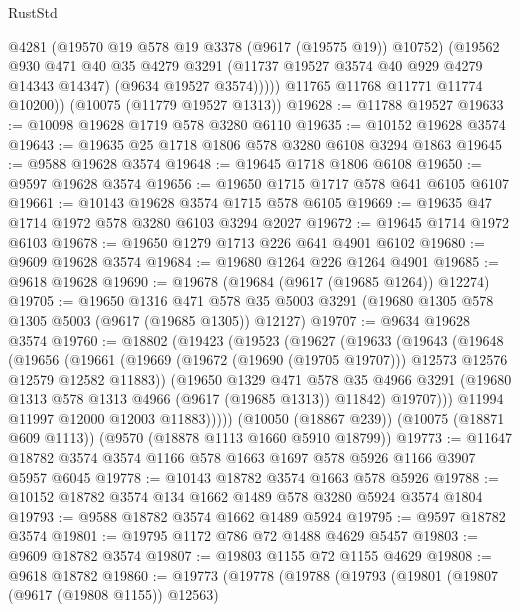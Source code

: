 \begin{lexlean}{RustStd}
\begin{coremodule}
{\begin{coremodule}
{{{{{{{{{{{{{{{{{{{{{{{{{{{{{{{{{              @4281
              (@19570 @19 @578 @19 @3378 (@9617 (@19575 @19)) @10752)
              (@19562
                @930
                @471
                @40
                @35
                @4279
                @3291
                (@11737 @19527 @3574 @40 @929 @4279 @14343 @14347)
                (@9634 @19527 @3574)))))
        @11765
        @11768
        @11771
        @11774
        @10200))
    (@10075 (@11779 @19527 @1313))
@19628 := @11788 @19527
@19633 := @10098 @19628 @1719 @578 @3280 @6110
@19635 := @10152 @19628 @3574
@19643 := @19635 @25 @1718 @1806 @578 @3280 @6108 @3294 @1863
@19645 := @9588 @19628 @3574
@19648 := @19645 @1718 @1806 @6108
@19650 := @9597 @19628 @3574
@19656 := @19650 @1715 @1717 @578 @641 @6105 @6107
@19661 := @10143 @19628 @3574 @1715 @578 @6105
@19669 := @19635 @47 @1714 @1972 @578 @3280 @6103 @3294 @2027
@19672 := @19645 @1714 @1972 @6103
@19678 := @19650 @1279 @1713 @226 @641 @4901 @6102
@19680 := @9609 @19628 @3574
@19684 := @19680 @1264 @226 @1264 @4901
@19685 := @9618 @19628
@19690 := @19678 (@19684 (@9617 (@19685 @1264)) @12274)
@19705 := @19650
    @1316
    @471
    @578
    @35
    @5003
    @3291
    (@19680 @1305 @578 @1305 @5003 (@9617 (@19685 @1305)) @12127)
@19707 := @9634 @19628 @3574
@19760 := @18802
    (@19423
      (@19523
        (@19627
          (@19633
            (@19643
              (@19648
                (@19656
                  (@19661
                    (@19669 (@19672 (@19690 (@19705 @19707))) @12573 @12576 @12579 @12582 @11883))
                  (@19650
                    @1329
                    @471
                    @578
                    @35
                    @4966
                    @3291
                    (@19680 @1313 @578 @1313 @4966 (@9617 (@19685 @1313)) @11842)
                    @19707)))
              @11994
              @11997
              @12000
              @12003
              @11883)))))
    (@10050 (@18867 @239))
    (@10075 (@18871 @609 @1113))
    (@9570 (@18878 @1113 @1660 @5910 @18799))
@19773 := @11647 @18782 @3574 @3574 @1166 @578 @1663 @1697 @578 @5926 @1166 @3907 @5957 @6045
@19778 := @10143 @18782 @3574 @1663 @578 @5926
@19788 := @10152 @18782 @3574 @134 @1662 @1489 @578 @3280 @5924 @3574 @1804
@19793 := @9588 @18782 @3574 @1662 @1489 @5924
@19795 := @9597 @18782 @3574
@19801 := @19795 @1172 @786 @72 @1488 @4629 @5457
@19803 := @9609 @18782 @3574
@19807 := @19803 @1155 @72 @1155 @4629
@19808 := @9618 @18782
@19860 := @19773
    (@19778
      (@19788
        (@19793
          (@19801
            (@19807 (@9617 (@19808 @1155)) @12563)
}}}}}}}}}}}}}}}}}}}}}}}}}}}}}}}}}
\end{coremodule}}
\end{coremodule}
\end{lexlean}
